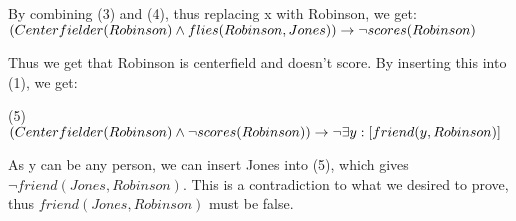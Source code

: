 \begin{large}
    By combining (3) and (4), thus replacing x with Robinson, we get: \\ $(Centerfielder(Robinson) \land flies(Robinson, Jones))  \\ \rightarrow \neg scores(Robinson)$

    Thus we get that Robinson is centerfield and doesn't score. By inserting this into (1), we get:

    (5) $(Centerfielder(Robinson) \land \neg scores(Robinson)) \\ \rightarrow \neg \exists y : [friend(y, Robinson)]$

    As y can be any person, we can insert Jones into (5), which gives \\ $\neg friend(Jones, Robinson)$.
    This is a contradiction to what we desired to prove, thus $friend(Jones, Robinson)$ must be false.
\end{large}